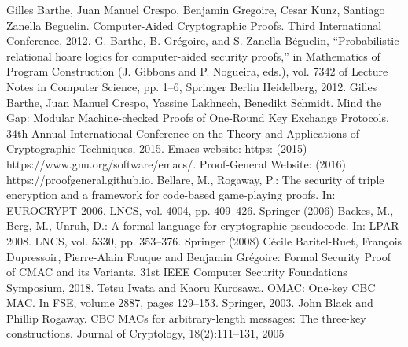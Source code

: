 \documentclass[runningheads]{llncs}
\begin{document}
\begin{thebibliography}{8}
Gilles Barthe, Juan Manuel Crespo, Benjamin Gregoire, Cesar Kunz, Santiago Zanella Beguelin. Computer-Aided Cryptographic Proofs. Third International Conference, 2012.
G. Barthe, B. Grégoire, and S. Zanella Béguelin, “Probabilistic relational hoare
logics for computer-aided security proofs,” in Mathematics of Program Construction
(J. Gibbons and P. Nogueira, eds.), vol. 7342 of Lecture Notes in
Computer Science, pp. 1–6, Springer Berlin Heidelberg, 2012.
Gilles Barthe, Juan Manuel Crespo, Yassine Lakhnech, Benedikt Schmidt. Mind the Gap: Modular Machine-checked Proofs of One-Round Key Exchange Protocols. 34th Annual International Conference on the Theory and Applications of Cryptographic Techniques, 2015.
Emacs website: https: (2015) https://www.gnu.org/software/emacs/.
Proof-General Website: (2016) https://proofgeneral.github.io.
Bellare, M., Rogaway, P.: The security of triple encryption and a framework for
code-based game-playing proofs. In: EUROCRYPT 2006. LNCS, vol. 4004, pp.
409–426. Springer (2006)
Backes, M., Berg, M., Unruh, D.: A formal language for cryptographic pseudocode.
In: LPAR 2008. LNCS, vol. 5330, pp. 353–376. Springer (2008)
Cécile Baritel-Ruet, François Dupressoir, Pierre-Alain Fouque and Benjamin Grégoire: Formal Security Proof of CMAC and its Variants.
31st IEEE Computer Security Foundations Symposium, 2018.
Tetsu Iwata and Kaoru Kurosawa. OMAC: One-key CBC MAC. In FSE, volume 2887, pages 129–153. Springer, 2003.
John Black and Phillip Rogaway. CBC MACs for arbitrary-length messages: The three-key constructions. Journal of Cryptology, 18(2):111–131, 2005
\end{thebibliography}
\end{document}
